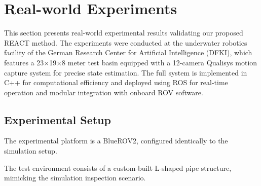 \section{Real-world Experiments}
\label{sec:real-world}

This section presents real-world experimental results validating our proposed \ac{REACT} method. The experiments were conducted at the underwater robotics facility of the German Research Center for Artificial Intelligence (DFKI), which features a 23$\times$19$\times$8 meter test basin equipped with a 12-camera Qualisys motion capture system for precise state estimation. The full system is implemented in C++ for computational efficiency and deployed using ROS for real-time operation and modular integration with onboard ROV software.

\subsection{Experimental Setup}
The experimental platform is a BlueROV2, configured identically to the simulation setup.

The test environment consists of a custom-built L-shaped pipe structure, mimicking the simulation inspection scenario.

